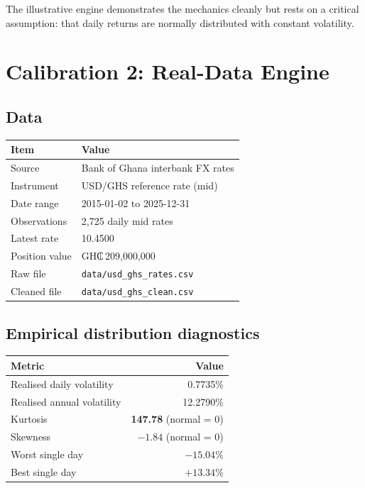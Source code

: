 \documentclass[11pt,a4paper]{article}
\newcommand{\ghs}[1]{\textnormal{GH₵\,#1}}
\begin{document}
\noindent The illustrative engine demonstrates the mechanics cleanly but
rests on a critical assumption: that daily returns are normally distributed
with constant volatility.

\section{Calibration 2: Real-Data Engine}

\subsection{Data}

\begin{table}[h!]
\centering
\renewcommand{\arraystretch}{1.3}
\begin{tabular}{L{7cm} L{7cm}}
\toprule
\textbf{Item} & \textbf{Value} \\
\midrule
Source              & Bank of Ghana interbank FX rates \\
Instrument          & USD/GHS reference rate (mid) \\
Date range          & 2015-01-02 to 2025-12-31 \\
Observations        & 2{,}725 daily mid rates \\
Latest rate         & 10.4500 \\
Position value      & \ghs{209{,}000{,}000} \\
Raw file            & \texttt{data/usd\_ghs\_rates.csv} \\
Cleaned file        & \texttt{data/usd\_ghs\_clean.csv} \\
\bottomrule
\end{tabular}
\end{table}

\subsection{Empirical distribution diagnostics}

\begin{table}[h!]
\centering
\renewcommand{\arraystretch}{1.3}
\begin{tabular}{L{7cm} r}
\toprule
\textbf{Metric} & \textbf{Value} \\
\midrule
Realised daily volatility      & 0.7735\% \\
Realised annual volatility     & 12.2790\% \\
Kurtosis                       & \textbf{147.78} (normal = 0) \\
Skewness                       & $-1.84$ (normal = 0) \\
Worst single day               & $-15.04\%$ \\
Best single day                & $+13.34\%$ \\
\bottomrule
\end{tabular}
\end{table}
\end{document}
